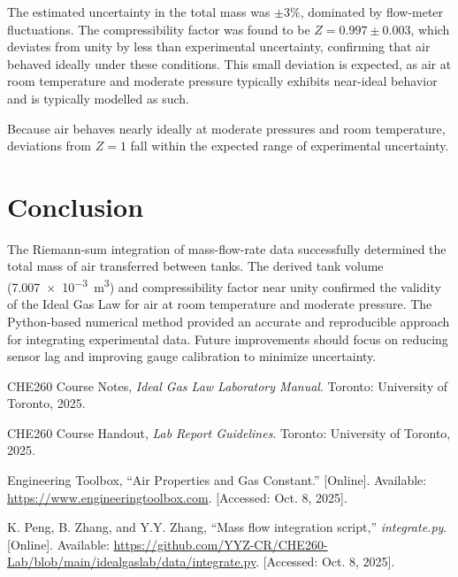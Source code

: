 \documentclass[12pt]{article}
\begin{document}
The estimated uncertainty in the total mass was \(\pm 3\%\), dominated by flow-meter fluctuations.  
The compressibility factor was found to be \(Z = 0.997 \pm 0.003\), which deviates from unity by less than experimental uncertainty, confirming that air behaved ideally under these conditions.
This small deviation is expected, as air at room temperature and moderate pressure typically exhibits near-ideal behavior and is typically modelled as such.


Because air behaves nearly ideally at moderate pressures and room temperature, deviations from \(Z=1\) fall within the expected range of experimental uncertainty.

\section*{Conclusion}
The Riemann-sum integration of mass-flow-rate data successfully determined the total mass of air transferred between tanks. The derived tank volume (\SI{7.007e-3}{\metre\cubed}) and compressibility factor near unity confirmed the validity of the Ideal Gas Law for air at room temperature and moderate pressure. The Python-based numerical method provided an accurate and reproducible approach for integrating experimental data. Future improvements should focus on reducing sensor lag and improving gauge calibration to minimize uncertainty.

\begin{thebibliography}{9}
CHE260 Course Notes, \textit{Ideal Gas Law Laboratory Manual}. Toronto: University of Toronto, 2025.

CHE260 Course Handout, \textit{Lab Report Guidelines}. Toronto: University of Toronto, 2025.

Engineering Toolbox, ``Air Properties and Gas Constant.'' [Online]. Available: \url{https://www.engineeringtoolbox.com}. [Accessed: Oct. 8, 2025].

K. Peng, B. Zhang, and Y.Y. Zhang, ``Mass flow integration script,'' \textit{integrate.py}. [Online]. Available: \url{https://github.com/YYZ-CR/CHE260-Lab/blob/main/idealgaslab/data/integrate.py}. [Accessed: Oct. 8, 2025].
\end{thebibliography}
\end{document}
